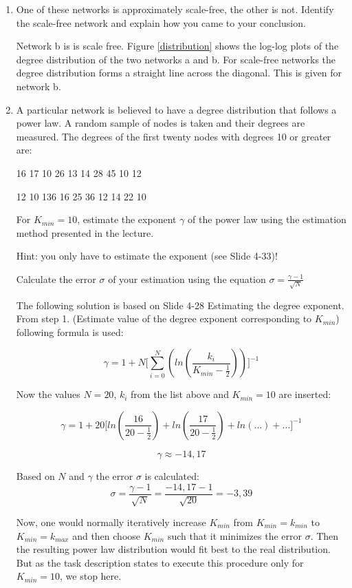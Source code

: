 \begin{enumerate}
	\item One of these networks is approximately scale-free, the other is not. Identify the scale-free network and explain how you came to your conclusion.
	
	Network b is is scale free. 
	Figure \ref{distribution} shows the log-log plots of the degree distribution of the two networks a and b. For scale-free networks the degree distribution forms a straight line across the diagonal. This is given for network b.
	
	\item A particular network is believed to have a degree distribution that follows a power law. A random sample of nodes is taken and their degrees are measured. The degrees of the first twenty nodes with degrees 10 or greater are: 
	
	16  17  10  26  13  14  28  45  10  12
	
	12  10  136  16  25  36  12  14  22  10
	
	For $K_{min} = 10$, estimate the exponent $\gamma$ of the power law using the estimation method presented in the lecture.
	
	Hint: you only have to estimate the exponent (see Slide 4-33)!
	
	Calculate the error $\sigma$ of your estimation using the equation $\sigma = \frac{\gamma - 1}{\sqrt{N}}$
	
	\vspace{0,75cm}
	The following solution is based on Slide 4-28 Estimating the degree exponent. From step 1. (Estimate value of the degree exponent corresponding to $K_{min}$) following formula is used:
	
	\begin{equation}
	\gamma = 1 + N \biggl[ \sum_{i=0}^N (ln(\frac{k_i}{K_{min} - \frac{1}{2}})) \biggr]^{-1}
	\end{equation}
	
	Now the values $N=20$, $k_i$ from the list above and $K_{min} = 10$ are inserted:
	
	\begin{equation*}
	\gamma = 1 + 20 \biggl[ ln(\frac{16}{20-\frac{1}{2}}) + ln(\frac{17}{20-\frac{1}{2}}) + ln(...) + ... \biggr]^{-1}
	\end{equation*}
	
	\begin{equation*}
	\gamma \approx -14,17
	\end{equation*}
	
	Based on $N$ and $\gamma$ the error $\sigma$ is calculated:
	\begin{equation*}
	\sigma = \frac{\gamma - 1}{\sqrt{N}} = \frac{-14,17 - 1}{\sqrt{20}} = -3,39
	\end{equation*}
	
	Now, one would normally iteratively increase $K_{min}$ from $K_{min} = k_{min}$ to $K_{min} = k_{max}$ and then choose $K_{min}$ such that it minimizes the error $\sigma$. Then the resulting power law distribution would fit best to the real distribution. But as the task description states to execute this procedure only for $K_{min} = 10$, we stop here.

\end{enumerate}